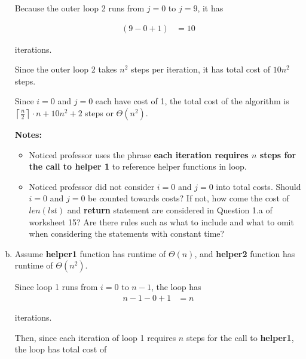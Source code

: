 \documentclass[12pt]{article}
\begin{document}
\begin{enumerate}[a.]
    Because the outer loop 2 runs from $j = 0$ to $j = 9$, it has

    \begin{align}
        (9 - 0 + 1) &= 10
    \end{align}

    iterations.

    \bigskip

    Since the outer loop 2 takes $n^2$ steps per iteration, it has total cost of
    $10n^2$ steps.

    \bigskip

    Since $i = 0$ and $j = 0$ each have cost of 1, the total cost of the algorithm
    is $\left\lceil \frac{n}{2} \right\rceil \cdot n + 10n^2 + 2$ steps or $\Theta(n^2)$.

    \bigskip

    \textbf{Notes:}

    \begin{itemize}
     \item Noticed professor uses the phrase \textbf{each iteration requires
     $n$ steps for the call to helper 1} to reference helper functions in loop.

     \item Noticed professor did not consider $i = 0$ and $j = 0$ into total costs.
     Should $i = 0$ and $j = 0$ be counted towards costs? If not, how come the cost of
     $len(lst)$ and \textbf{return} statement are considered in Question 1.a of
     worksheet 15? Are there rules such as what to include and what to omit
     when considering the statements with constant time?

    \end{itemize}

    \item

    Assume \textbf{helper1} function has runtime of $\Theta(n)$, and \textbf{helper2}
    function has runtime of $\Theta(n^2)$.

    \bigskip

    Since loop 1 runs from $i = 0$ to $n-1$, the loop has
    \setcounter{equation}{0}
    \begin{align}
        n - 1 - 0 + 1 &= n
    \end{align}

    iterations.

    \bigskip

    Then, since each iteration of loop 1 requires $n$ steps for the call to
    \textbf{helper1}, the loop has total cost of


\end{enumerate}
\end{document}
